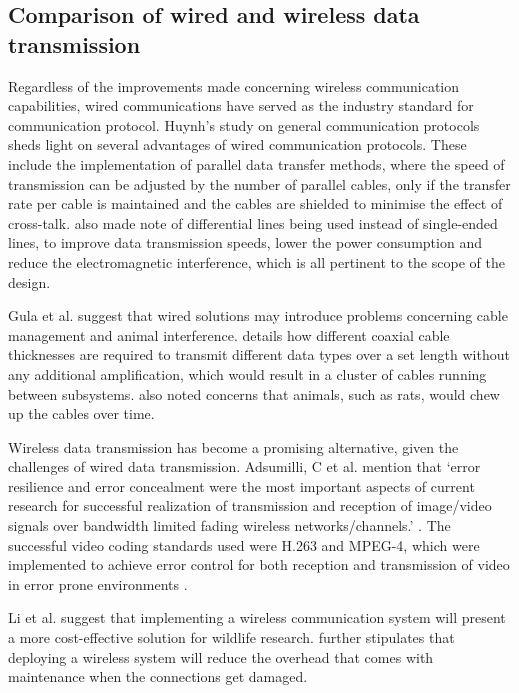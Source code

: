 \documentclass[class=report,11pt,crop=false]{standalone}
\begin{document}
\subsection{Comparison of wired and wireless data transmission}

Regardless of the improvements made concerning wireless communication capabilities, wired communications have served as the industry standard for communication protocol. Huynh’s study on general communication protocols \cite{huynh2010study} sheds light on several advantages of wired communication protocols. These include the implementation of parallel data transfer methods, where the speed of transmission can be adjusted by the number of parallel cables, only if the transfer rate per cable is maintained and the cables are shielded to minimise the effect of cross-talk. \cite{huynh2010study} also made note of differential lines being used instead of single-ended lines, to improve data transmission speeds, lower the power consumption and reduce the electromagnetic interference, which is all pertinent to the scope of the design.

Gula et al. suggest that wired solutions may introduce problems concerning cable management and animal interference. \cite{gula2010audio} details how different coaxial cable thicknesses are required to transmit different data types over a set length without any additional amplification, which would result in a cluster of cables running between subsystems. \cite{gula2010audio} also noted concerns that animals, such as rats, would chew up the cables over time. 

Wireless data transmission has become a promising alternative, given the challenges of wired data transmission. Adsumilli, C et al.  mention that ‘error resilience and error concealment were the most important aspects of current research for successful realization of transmission and reception of image/video signals over bandwidth limited fading wireless networks/channels.’ \cite{adsumilli2002adaptive}. The successful video coding standards used were H.263 and MPEG-4, which were implemented to achieve error control for both reception and transmission of video in error prone environments \cite{adsumilli2002adaptive}. 

Li et al. \cite{li2010design} suggest that implementing a wireless communication system will present a more cost-effective solution for wildlife research.  \cite{li2010design} further stipulates that deploying a wireless system will reduce the overhead that comes with maintenance when the connections get damaged.
\end{document}
